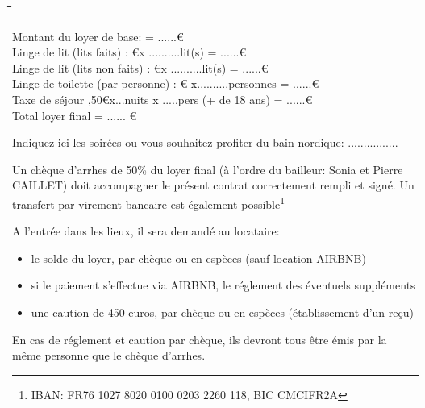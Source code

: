\documentclass[a4paper,11pt]{article}
\begin{document}
\begin{tabbing}
  
 \hspace{7cm}\=  										\hspace{1cm}\=   	\hspace{6cm}\= 	\hspace{1cm}\= 		\hspace{1cm}\=	\kill


Montant du loyer de base: \>		\>		\>=			\>......\>\euro	   		\\
Linge de lit (lits faits) :			 					\euro		      			\>x ..........lit(s)       				\>=  			\>......\>\euro				\\

Linge de lit (lits non faits) :			 					\euro		      			\>x ..........lit(s)       				\>=  			\>......\>\euro				\\



Linge de toilette (par personne) :					 					\euro      				\> x..........personnes						\>=  			\>......\>\euro				\\



Taxe de séjour ,50\euro		\>x...nuits x .....pers (+ de 18 ans)		\>=			\>......\>\euro	   		\\



Total loyer final    										\>						\>  					\>=  							\>......					\>\euro			\\ 

 \end{tabbing}


\vspace{0.5cm}

Indiquez ici les soirées ou vous souhaitez profiter du bain nordique: ................

\vspace{0.5cm}

  
Un chèque d'arrhes de 50\% du loyer final (à l'ordre du bailleur: Sonia et Pierre CAILLET)  doit accompagner le présent contrat correctement rempli et signé. Un transfert par virement bancaire est également possible\footnote{IBAN: FR76 1027 8020 0100 0203 2260 118, BIC CMCIFR2A}

\vspace{0.5cm}

A l'entrée dans les lieux, il sera demandé au locataire:
\begin{itemize}
\item le solde du loyer, par chèque ou en espèces (sauf location AIRBNB)
\item si le paiement s'effectue via AIRBNB, le réglement des éventuels suppléments
\item une caution de 450 euros, par chèque ou en espèces (établissement d'un reçu)
\end{itemize}
En cas de réglement et caution par chèque, ils devront tous être émis par la même personne que le chèque d'arrhes.
\end{document}
